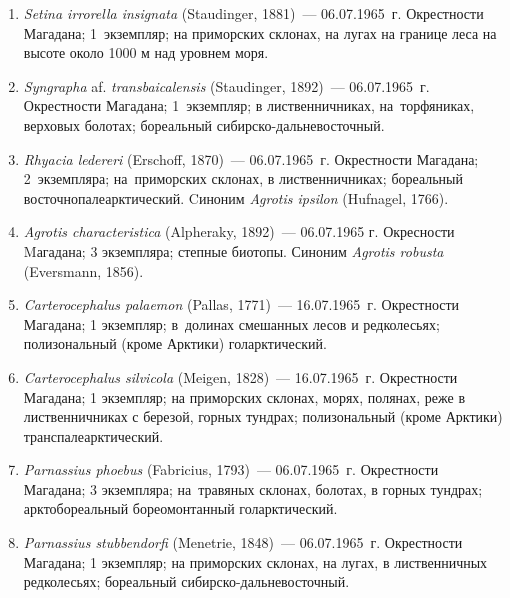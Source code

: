 \begin{enumerate}[noitemsep, leftmargin=0cm]

      \item \textit{Setina irrorella insignata} (Staudinger, 1881)~--- 06.07.1965~г. Окрестности Магадана; 1~экземпляр; на приморских склонах, на лугах на границе леса на высоте около 1000 м над уровнем моря.


      \item \textit{Syngrapha} af. \textit{transbaicalensis} (Staudinger, 1892)~--- 06.07.1965~г. Окрестности Магадана; 1~экземпляр; в лиственничниках, на~торфяниках, верховых болотах; бореальный сибирско-дальневосточный.

      \item \textit{Rhyacia ledereri} (Erschoff, 1870)~--- 06.07.1965~г. Окрестности Магадана; 2~экземпляра; на~приморских склонах, в лиственничниках; бореальный восточнопалеарктический. Cиноним \textit{Agrotis ipsilon} (Hufnagel, 1766).

      \item \textit{Agrotis characteristica} (Alpheraky, 1892)~--- 06.07.1965 г. Окресности Mагадана; 3 экземпляра; степные биотопы. Синоним \textit{Agrotis robusta} (Eversmann, 1856).


      \item \textit{Carterocephalus palaemon} (Pallas, 1771)~--- 16.07.1965~г. Окрестности Магадана; 1 экземпляр; в~долинах смешанных лесов и редколесьях; полизональный (кроме Арктики) голарктический.

      \item \textit{Carterocephalus silvicola} (Meigen, 1828)~--- 16.07.1965~г. Окрестности Магадана; 1 экземпляр; на приморских склонах, морях, полянах, реже в лиственничниках с березой, горных тундрах; полизональный (кроме Арктики) транспалеарктический.


      \item \textit{Parnassius phoebus} (Fabricius, 1793)~--- 06.07.1965~г. Окрестности Магадана; 3 экземпляра; на~травяных склонах, болотах, в горных тундрах; арктобореальный бореомонтанный голарктический.

    \item \textit{Parnassius stubbendorfi} (Menetrie, 1848)~--- 06.07.1965~г. Окрестности Магадана; 1 экземпляр; на приморских склонах, на лугах, в лиственничных редколесьях; бореальный сибирско-дальневосточный.


\end{enumerate}
